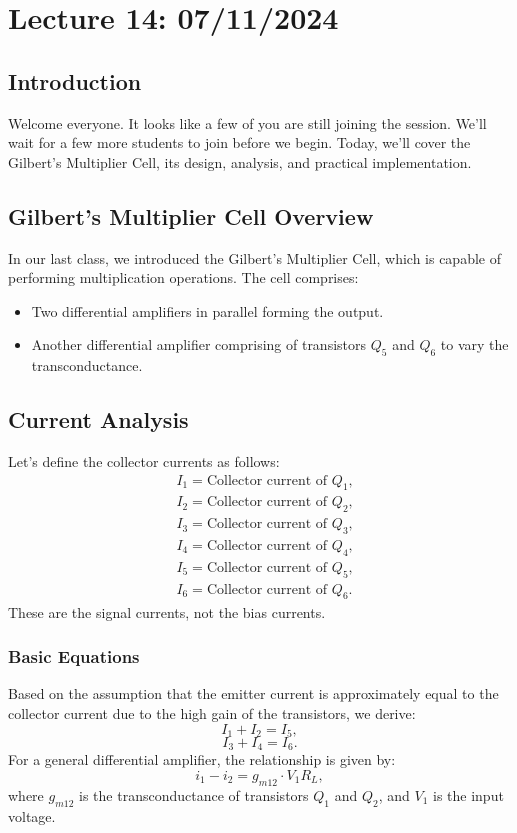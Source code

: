 \section{Lecture 14: 07/11/2024}

\subsection{Introduction}
Welcome everyone. It looks like a few of you are still joining the session. We'll wait for a few more students to join before we begin. Today, we'll cover the Gilbert's Multiplier Cell, its design, analysis, and practical implementation.

\subsection{Gilbert's Multiplier Cell Overview}
In our last class, we introduced the Gilbert's Multiplier Cell, which is capable of performing multiplication operations. The cell comprises:
\begin{itemize}
    \item Two differential amplifiers in parallel forming the output.
    \item Another differential amplifier comprising of transistors $Q_5$ and $Q_6$ to vary the transconductance.
\end{itemize}

\subsection{Current Analysis}
Let’s define the collector currents as follows:
\begin{align*}
    &I_1 = \text{Collector current of } Q_1, \\
    &I_2 = \text{Collector current of } Q_2, \\
    &I_3 = \text{Collector current of } Q_3, \\
    &I_4 = \text{Collector current of } Q_4, \\
    &I_5 = \text{Collector current of } Q_5, \\
    &I_6 = \text{Collector current of } Q_6.
\end{align*}
These are the signal currents, not the bias currents.

\subsubsection{Basic Equations}
Based on the assumption that the emitter current is approximately equal to the collector current due to the high gain of the transistors, we derive:
\[
I_1 + I_2 = I_5,
\]
\[
I_3 + I_4 = I_6.
\]
For a general differential amplifier, the relationship is given by:
\[
i_1 - i_2 = g_{m12} \cdot V_1 R_L,
\]
where $g_{m12}$ is the transconductance of transistors $Q_1$ and $Q_2$, and $V_1$ is the input voltage.

